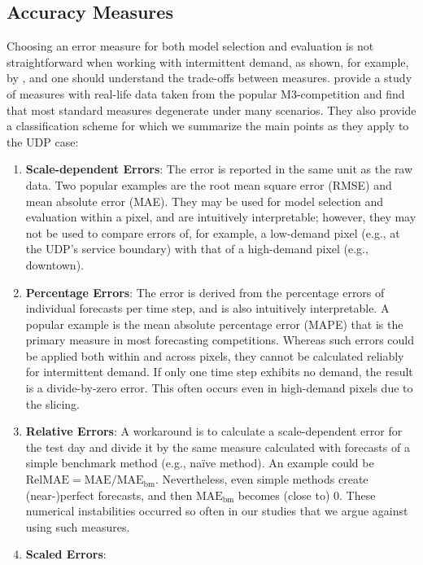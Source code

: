 \subsection{Accuracy Measures}
\label{mase}

Choosing an error measure for both model selection and evaluation is not
    straightforward when working with intermittent demand, as shown, for
    example, by \cite{syntetos2005}, and one should understand the trade-offs
    between measures.
\cite{hyndman2006} provide a study of measures with real-life data taken from
    the popular M3-competition and find that most standard measures degenerate
    under many scenarios.
They also provide a classification scheme for which we summarize the main
    points as they apply to the UDP case:
\begin{enumerate}
\item \textbf{Scale-dependent Errors}:
The error is reported in the same unit as the raw data.
Two popular examples are the root mean square error (RMSE) and mean absolute
    error (MAE).
They may be used for model selection and evaluation within a pixel, and are
    intuitively interpretable; however, they may not be used to compare errors
    of, for example, a low-demand pixel (e.g., at the UDP's service
    boundary) with that of a high-demand pixel (e.g., downtown).
\item \textbf{Percentage Errors}:
The error is derived from the percentage errors of individual forecasts per
    time step, and is also intuitively interpretable.
A popular example is the mean absolute percentage error (MAPE) that is the
    primary measure in most forecasting competitions.
Whereas such errors could be applied both within and across pixels, they
    cannot be calculated reliably for intermittent demand.
If only one time step exhibits no demand, the result is a divide-by-zero
    error.
This often occurs even in high-demand pixels due to the slicing.
\item \textbf{Relative Errors}:
A workaround is to calculate a scale-dependent error for the test day and
    divide it by the same measure calculated with forecasts of a simple
    benchmark method (e.g., na\"{i}ve method).
An example could be
    $\text{RelMAE} = \text{MAE} / \text{MAE}_\text{bm}$.
Nevertheless, even simple methods create (near-)perfect forecasts, and then
    $\text{MAE}_\text{bm}$ becomes (close to) $0$.
These numerical instabilities occurred so often in our studies that we argue
    against using such measures.
\item \textbf{Scaled Errors}:

\end{enumerate}
